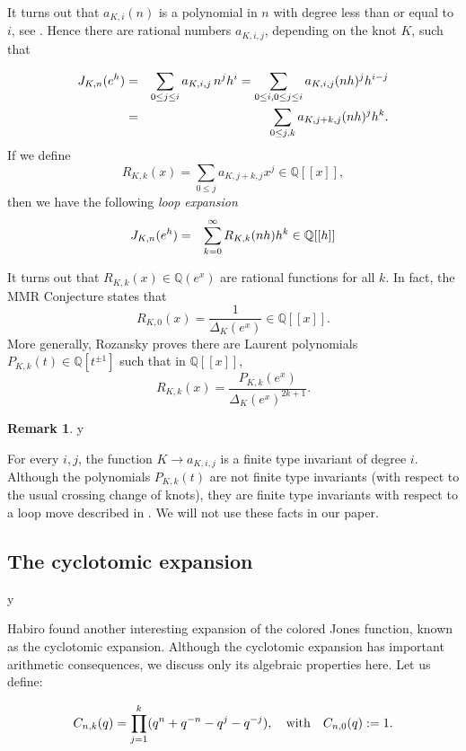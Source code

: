 \documentclass{amsart}
\theoremstyle{definition}
\newtheorem{remark}[theorem]{Remark}
\def\printname#1{
    \if\draft y
        \smash{\makebox[0pt]{\hspace{-0.5in}
            \raisebox{8pt}{\tt\tiny #1}}}
    \fi
}
\def\lbl#1{\label{#1}\printname{#1}}
\def\BQ{\mathbb Q}
\def\D{\Delta}
\begin{document}
It turns out that $a_{K,i}(n)$ is a polynomial in $n$ with degree less
than or equal to $i$, see \cite{B-NG}. Hence there are rational numbers
$a_{K,i,j}$, depending on the knot $K$, such that

\begin{eqnarray}
\lbl{eq.pert} J_{K,n}(e^h) &=& \sum_{0 \leq j \leq i} a_{K,i,j}\, n^j
h^i  = \sum_{0 \leq i, 0 \leq j \leq i} a_{K,i,j} (nh)^j h^{i-j}\notag \\
\notag &=& \sum_{0 \leq j, k} a_{K,j+k,j} (nh)^j h^k.
\end{eqnarray}
If we define
$$
R_{K,k}(x)=\sum_{0 \leq j} a_{K,j+k,j} x^j \in \BQ[[x]],
$$
then we have the following {\em loop expansion}
\begin{eqnarray}
\lbl{eq.R}
J_{K,n}(e^h) &=& \sum_{k=0}^\infty R_{K,k}(nh) h^k \in \BQ[[h]]
\end{eqnarray}

It turns out that $R_{K,k}(x) \in \BQ(e^x)$ are rational functions
for all $k$. In fact,
the MMR Conjecture states that
$$
R_{K,0}(x)=\frac{1}{\D_K(e^x)} \in \BQ[[x]].
$$
More generally, Rozansky \cite{Ro1} proves  there are Laurent
polynomials $P_{K,k}(t) \in \BQ[t^{\pm 1}]$ such that in $\BQ[[x]]$,
$$
R_{K,k}(x)=\frac{P_{K,k}(e^x)}{\D_K(e^x)^{2k+1}}.
$$

\begin{remark}
\lbl{rem.aij}
For every $i,j$, the function $K \to a_{K,i,j}$ is a finite type invariant
of degree $i$.
Although the polynomials $P_{K,k}(t)$ are not finite type invariants
(with respect to the usual crossing change of knots), they are
finite type invariants with respect to a loop move described in \cite{GR}.
We will not use these facts in our paper.
\end{remark}


\subsection{The cyclotomic expansion}
\lbl{sub.cyclotomic}


Habiro  found another interesting expansion of the colored Jones function, known as the
cyclotomic expansion. Although the cyclotomic expansion has important
arithmetic consequences, we discuss only its algebraic properties here. Let
us define:

\begin{equation}
\lbl{eq.Ckernel}
C_{n,k}(q) = \prod_{j=1}^{k} (q^n+q^{-n}-q^j-q^{-j}),
\quad \text{with} \quad C_{n,0}(q)
 :=1.
\end{equation}
\end{document}
